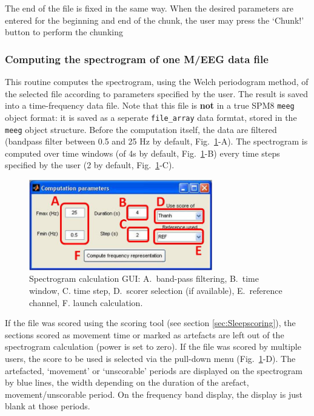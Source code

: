 \documentclass[a4paper,titlepage]{article}
\begin{document}
The end of the file is fixed in the same way. When the desired parameters are entered for the beginning and end of the chunk, the user may press the `Chunk!' button to perform the chunking

\subsubsection{Computing the spectrogram of one M/EEG data file}
\label{sec:spect_cmp}
This routine computes the spectrogram, using the Welch periodogram method, of the selected file according to parameters specified by the user. The result is saved into a time-frequency data file. Note that this file is {\bf not} in a true SPM8 {\tt meeg} object format: it is saved as a seperate {\tt file\_array} data formtat, stored in the {\tt meeg} object structure.
Before the computation itself, the data are filtered (bandpass filter between 0.5 and 25 Hz by default, Fig.~\ref{fig:TB_spect_cmp}-A). The spectrogram is computed over time windows (of 4s by default, Fig.~\ref{fig:TB_spect_cmp}-B) every time steps specified by the user (2 by default, Fig.~\ref{fig:TB_spect_cmp}-C).
\begin{figure}[ht]
	\centering
		\includegraphics[width=8cm]{images/FIG6_spect_cmp.jpg}
	\caption{Spectrogram calculation GUI: A.~band-pass filtering, B.~time window, C. time step, D.~scorer selection (if available), E.~reference channel, F. launch calculation.
	\label{fig:TB_spect_cmp}}
\end{figure}

If the file was scored using the scoring tool (see section \ref{sec:Sleepscoring}), the sections scored as movement time or marked as artefacts are left out of the spectrogram calculation (power is set to zero). If the file was scored by multiple users, the score to be used is selected via the pull-down menu (Fig.~\ref{fig:TB_spect_cmp}-D).
The artefacted, `movement' or `unscorable' periods are displayed on the spectrogram by blue lines, the width depending on the duration of the arefact, movement/unscorable period. On the frequency band display, the display is just blank at those periods.
\end{document}
